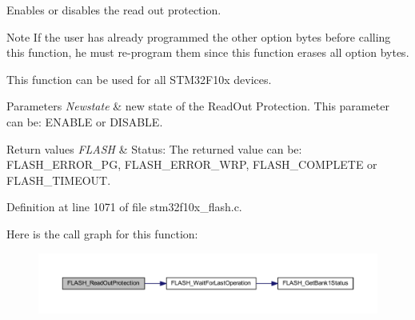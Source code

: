Enables or disables the read out protection. 

\begin{DoxyNote}{Note}
If the user has already programmed the other option bytes before calling this function, he must re-\/program them since this function erases all option bytes. 

This function can be used for all S\+T\+M32\+F10x devices. 
\end{DoxyNote}

\begin{DoxyParams}{Parameters}
{\em Newstate} & new state of the Read\+Out Protection. This parameter can be\+: E\+N\+A\+B\+LE or D\+I\+S\+A\+B\+LE. \\
\hline
\end{DoxyParams}

\begin{DoxyRetVals}{Return values}
{\em F\+L\+A\+SH} & Status\+: The returned value can be\+: F\+L\+A\+S\+H\+\_\+\+E\+R\+R\+O\+R\+\_\+\+PG, F\+L\+A\+S\+H\+\_\+\+E\+R\+R\+O\+R\+\_\+\+W\+RP, F\+L\+A\+S\+H\+\_\+\+C\+O\+M\+P\+L\+E\+TE or F\+L\+A\+S\+H\+\_\+\+T\+I\+M\+E\+O\+UT. \\
\hline
\end{DoxyRetVals}


Definition at line 1071 of file stm32f10x\+\_\+flash.\+c.

Here is the call graph for this function\+:
\nopagebreak
\begin{figure}[H]
\begin{center}
\leavevmode
\includegraphics[width=350pt]{group___f_l_a_s_h___exported___functions_ga0b8d1a8277950c890bbc247bbeafb40f_cgraph}
\end{center}
\end{figure}
\mbox{\label{group___f_l_a_s_h___exported___functions_ga54bcb96270215c752c3479c8c9e438c0}} 
